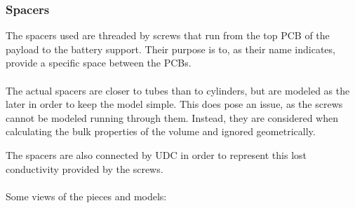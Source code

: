 \subsubsection{Spacers}
The spacers used are threaded by screws that run from the top PCB of the payload to the battery support.
Their purpose is to, as their name indicates, provide a specific space between the PCBs.

\paragraph{}

The actual spacers are closer to tubes than to cylinders, but are modeled as the later in order to keep the model 
simple. This does pose an issue, as the screws cannot be modeled running through them. Instead, they are 
considered when calculating the bulk properties of the volume and ignored geometrically.

The spacers are also connected by UDC in order to represent this lost conductivity provided by the screws.

\paragraph{}

Some views of the pieces and models:

